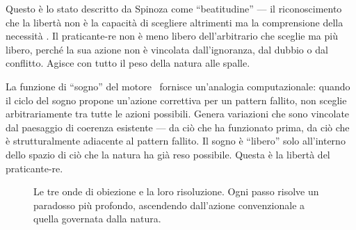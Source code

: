 Questo \`e lo stato descritto da Spinoza come ``beatitudine'' --- il
riconoscimento che la libert\`a non \`e la capacit\`a di scegliere
altrimenti ma la comprensione della necessit\`a
\parencite[V.P42]{spinoza1994ethics}. Il praticante-re non \`e meno
libero dell'arbitrario che sceglie ma pi\`u libero, perch\'e la sua
azione non \`e vincolata dall'ignoranza, dal dubbio o dal conflitto.
Agisce con tutto il peso della natura alle spalle.

La funzione di ``sogno'' del motore \physis\ fornisce un'analogia
computazionale: quando il ciclo del sogno propone un'azione correttiva
per un pattern fallito, non sceglie arbitrariamente tra tutte le azioni
possibili. Genera variazioni che sono vincolate dal paesaggio di coerenza
esistente --- da ci\`o che ha funzionato prima, da ci\`o che \`e
strutturalmente adiacente al pattern fallito. Il sogno \`e ``libero''
solo all'interno dello spazio di ci\`o che la natura ha gi\`a reso
possibile. Questa \`e la libert\`a del praticante-re.

\begin{figure}[ht]
\centering
{}
\caption{Le tre onde di obiezione e la loro risoluzione. Ogni passo risolve un paradosso
pi\`u profondo, ascendendo dall'azione convenzionale a quella governata dalla natura.
\label{fig:treonde}}
\end{figure}

